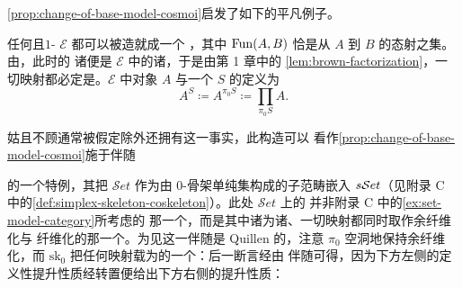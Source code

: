 \cref{prop:change-of-base-model-cosmoi}启发了如下\trInfinityCosmos{}的平凡例子。

\begin{example}[作为∞-宇宙的 1-范畴]\label{exa:one-categories-as-cosmoi}
任何\trComplete{}且\trLocallySmall $1$-\trCategory{} $\mathcal{E}$ 都可以被造就成一个%
\trInfinityCosmos，其中 $\operatorname{Fun}(A,B)$ 恰是从 $A$ 到 $B$ 的态射之集。由\trYonedaLemma，此时的
诸\trEquivalence{}便是 $\mathcal{E}$ 中的诸\trIsomorphism，于是由第 1 章中的%
\cref{lem:brown-factorization}，一切映射都必定是\trIsofibration。$\mathcal{E}$ 中对象
$A$ 与一个\trSimplicialSet{} $S$ 的\trCotensor{}定义为
\[
A^{S}\coloneqq A^{\pi_{0}S}\coloneqq\prod_{\pi_{0}S}A.
\]
\end{example}

姑且不顾\trModelCategory{}通常被假定除\trLimit{}外还拥有\trColimit{}这一事实，此构造可以
看作\cref{prop:change-of-base-model-cosmoi}施于伴随
\begin{center}
\end{center}
的一个特例，其\trRightAdjoint{}把 $\mathcal{S}et$ 作为由 0-骨架单纯集构成的子范畴嵌入
$s\mathcal{S}et$（见附录 C 中的\cref{def:simplex-skeleton-coskeleton}）。此处 $\mathcal{S}et$ 上的%
\trCartesianClosed\trModelStructure{}并非附录 C 中的\cref{ex:set-model-category}所考虑的
那一个，而是其中诸\trWeakEquivalence{}为诸\trIsomorphism、一切映射都同时取作余纤维化与
纤维化的那一个。为见这一伴随是 Quillen 的，注意 $\pi_{0}$ 空洞地保持余纤维化，而
$\mathrm{sk}_{0}$ 把任何映射载为\trQuasiCategory{}的一个\trIsofibration：后一断言经由
伴随可得，因为下方左侧的定义性提升性质经转置便给出下方右侧的提升性质：
